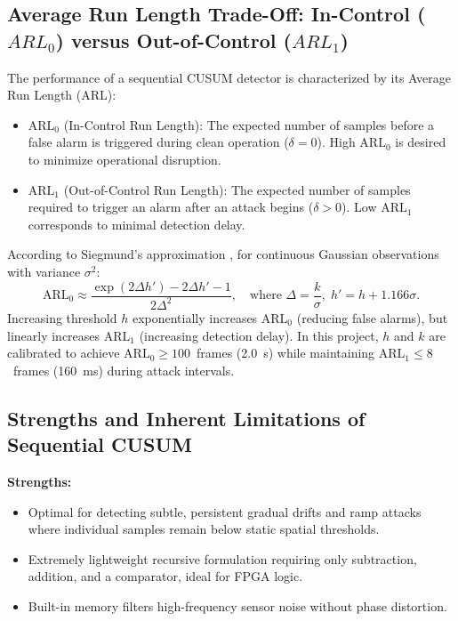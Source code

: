\documentclass[12pt,a4paper]{report}
\begin{document}
\subsection{Average Run Length Trade-Off: In-Control ($ARL_0$) versus Out-of-Control ($ARL_1$)}
The performance of a sequential CUSUM detector is characterized by its Average Run Length (ARL):
\begin{itemize}
    \item $\text{ARL}_0$ (In-Control Run Length): The expected number of samples before a
    false alarm is triggered during clean operation ($\delta = 0$). High $\text{ARL}_0$ is
    desired to minimize operational disruption.
    \item $\text{ARL}_1$ (Out-of-Control Run Length): The expected number of samples required
    to trigger an alarm after an attack begins ($\delta > 0$). Low $\text{ARL}_1$ corresponds
    to minimal detection delay.
\end{itemize}
According to Siegmund's approximation \cite{page1954,ross2014}, for continuous Gaussian observations
with variance $\sigma^2$:
\begin{equation}
\text{ARL}_0 \approx \frac{\exp(2 \Delta h') - 2 \Delta h' - 1}{2 \Delta^2}, \quad \text{where } \Delta = \frac{k}{\sigma}, \; h' = h + 1.166\sigma.
\end{equation}
Increasing threshold $h$ exponentially increases $\text{ARL}_0$ (reducing false alarms),
but linearly increases $\text{ARL}_1$ (increasing detection delay). In this project, $h$ and
$k$ are calibrated to achieve $\text{ARL}_0 \ge 100$~frames (2.0~s) while maintaining
$\text{ARL}_1 \le 8$~frames (160~ms) during attack intervals.

\subsection{Strengths and Inherent Limitations of Sequential CUSUM}
\textbf{Strengths:}
\begin{itemize}
    \item Optimal for detecting subtle, persistent gradual drifts and ramp attacks where
    individual samples remain below static spatial thresholds.
    \item Extremely lightweight recursive formulation requiring only subtraction, addition,
    and a comparator, ideal for FPGA logic.
    \item Built-in memory filters high-frequency sensor noise without phase distortion.
\end{itemize}
\end{document}

